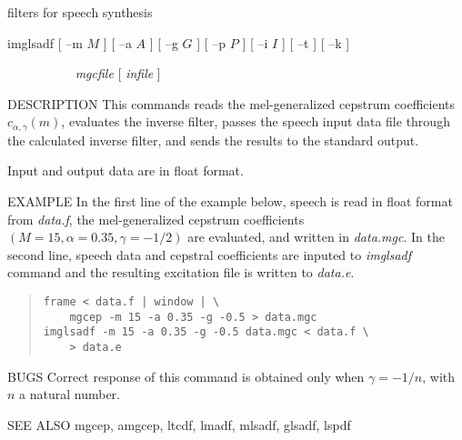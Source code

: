 {filters for speech synthesis}

\begin{synopsis}
\item [imglsadf] [ --m $M$ ] [ --a $A$ ] [ --g $G$ ] [ --p $P$ ]
		 [ --i $I$ ]  [ --t ]  [ --k ]
\item [\ ~~~~~~~~~] {\em mgcfile} [ {\em infile} ]
\end{synopsis}

\begin{qsection}{DESCRIPTION}
This commands reads the mel-generalized cepstrum coefficients
 $c_{\alpha,\gamma}(m)$, evaluates the inverse filter,
passes the speech input data file through the calculated
inverse filter, and sends the results to the standard output.
\par
Input and output data are in float format.
\end{qsection}

\begin{options}
\end{options}

\begin{qsection}{EXAMPLE}
In the first line of the example below, 
speech is read in float format from {\em data.f},
the mel-generalized cepstrum coefficients $(M=15,\alpha=0.35,\gamma=-1/2)$
are evaluated, and written in {\em data.mgc}.
In the second line,
speech data and cepstral coefficients are
inputed to {\em imglsadf} command and the resulting excitation file
is written to {\em data.e}.
\begin{quote}
 \verb!frame < data.f | window | \!\\
 \verb!    mgcep -m 15 -a 0.35 -g -0.5 > data.mgc!\\
 \verb!imglsadf -m 15 -a 0.35 -g -0.5 data.mgc < data.f \!\\
 \verb!    > data.e!
\end{quote} 
\end{qsection}

\begin{qsection}{BUGS}
Correct response of this command is obtained only when
$\gamma = -1/n$, with $n$ a natural number.
\end{qsection}

\begin{qsection}{SEE ALSO}
 mgcep, amgcep, ltcdf, lmadf, mlsadf, glsadf, lspdf
\end{qsection}
